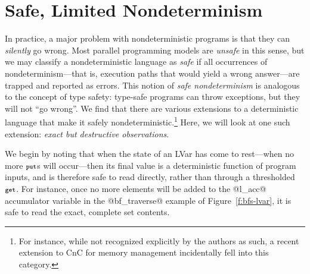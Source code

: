 

\section{Safe, Limited Nondeterminism}\label{section:extensions}

  In practice, a major problem with nondeterministic programs is
  that they can {\em silently} go wrong.
  Most parallel programming models are {\em unsafe} in this sense, 
  but we may classify a nondeterministic language as {\em safe} if all occurrences
  of nondeterminism---that is, execution paths that would yield a wrong
  answer---are trapped and reported as errors.
  This notion of \emph{safe nondeterminism} is analogous to the concept of type
  safety: type-safe programs can throw
  exceptions, but they will not ``go wrong''. 
{%
%
%
We find that there are various extensions
to a deterministic
language that make it safely nondeterministic.\footnote{For instance, while not recognized explicitly by the
   authors as such, a recent extension to CnC for memory management \cite{cnc-space-folding} incidentally fell into this
   category.}  
Here, we will look at one such extension:
{\em exact but destructive observations}.}

%
We begin by noting
that when the state of an LVar has come to rest---when no
more $\mbox{\footnotesize \texttt{put}}$s will occur---then its final value is a deterministic
function of program inputs, and is therefore safe to read directly, 
rather than through a thresholded $\mbox{\footnotesize \texttt{get}}$.
For instance, once no more elements will be added to
the @l_acc@ accumulator variable in the @bf_traverse@
example of Figure~\ref{f:bfs-lvar},
  it is safe to read the exact, complete set contents.

